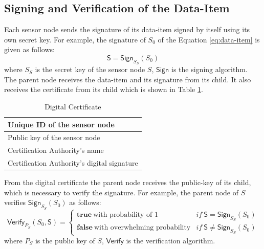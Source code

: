 	\subsection{Signing and Verification of the Data-Item}
		\label{subsection:Signing and Verification of the Data-Item}
		Each sensor node sends the signature of its data-item signed by itself using its own secret key. 
		For example, the signature of $S_{0}$ of the Equation \ref{eq:data-item} is given as follows:
		\begin{equation}
			\textsf{S} = \textsf{Sign}_{S_{S}}(S_{0})
		\end{equation}
		where $S_{S}$ is the secret key of the sensor node $S$, $\textsf{Sign}$ is the signing algorithm.
		The parent node receives the data-item and its signature from its child. 
		It also receives the certificate from its child which is shown in Table \ref{table:digital-certificate}.
		\begin{table}[!htb]	
			\begin{center}
				\begin{tabular}{ |l| }
			    \hline
			    Unique ID of the sensor node \\
			    \hline
			    Public key of the sensor node \\	
			    \hline
			    Certification Authority's name \\
			    \hline
			    Certification Authority's digital signature \\
			    \hline
				\end{tabular}
			\end{center}
	  	\caption{Digital Certificate}
		  \label{table:digital-certificate}
	  \end{table}
	  From the digital certificate the parent node receives the public-key of its child, which is necessary to verify the signature.
	  For example, the parent node of $S$ verifies $\textsf{Sign}_{S_{S}}(S_{0})$ as follows:
	  \begin{equation}
			\textsf{Verify}_{P_{S}}(S_{0},\textsf{S}) = 
			\begin{cases}
			 \textbf{true}\ \mbox{with probability of 1} & if\ \textsf{S} = \textsf{Sign}_{S_{S}}(S_{0})\\
			 \textbf{false}\ \mbox{with overwhelming probability} & if\ \textsf{S} \neq \textsf{Sign}_{S_{S}}(S_{0})
			\end{cases}
			\label{eq:verification}
		\end{equation}
	  where $P_{S}$ is the public key of $S$, $\textsf{Verify}$ is the verification algorithm.
	
